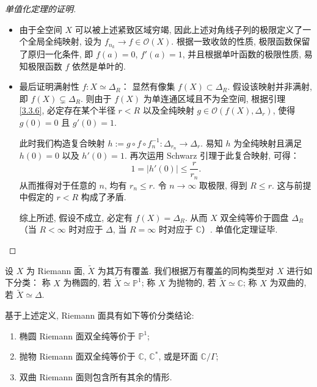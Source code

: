 \begin{proof}[单值化定理的证明]
\begin{itemize}
\item[(e)]\qquad 由于全空间 $X$ 可以被上述紧致区域穷竭, 因此上述对角线子列的极限定义了一个全局全纯映射, 设为 $f_{n_k} \to f \in \mathcal{O}(X)$. 根据一致收敛的性质, 极限函数保留了原归一化条件, 即 $f(a)=0$, $f'(a)=1$, 并且根据单叶函数的极限性质, 易知极限函数 $f$ 依然是单叶的. 

\item[(f)]\qquad 最后证明满射性 $f: X \simeq \Delta_R$：
显然有像集 $f(X) \subset \Delta_R$. 假设该映射并非满射, 即 $f(X) \subsetneq \Delta_R$. 则由于 $f(X)$ 为单连通区域且不为全空间, 根据引理 \ref{3.3.6}, 必定存在某个半径 $r < R$ 以及全纯映射 $g \in \mathcal{O}(f(X), \Delta_r)$, 使得 $g(0)=0$ 且 $g'(0)=1$. 

\qquad 此时我们构造复合映射 $h := g \circ f \circ f_n^{-1} : \Delta_{r_n} \to \Delta_r$. 易知 $h$ 为全纯映射且满足 $h(0)=0$ 以及 $h'(0)=1$. 再次运用 Schwarz 引理于此复合映射, 可得：
\[ 1 = |h'(0)| \leqslant \frac{r}{r_n}. \]
从而推得对于任意的 $n$, 均有 $r_n \leqslant r$. 令 $n \to \infty$ 取极限, 得到 $R \leqslant r$. 这与前提中假定的 $r < R$ 构成了矛盾. 

\qquad 综上所述, 假设不成立, 必定有 $f(X) = \Delta_R$. 从而 $X$ 双全纯等价于圆盘 $\Delta_R$（当 $R<\infty$ 时对应于 $\Delta$, 当 $R=\infty$ 时对应于 $\mathbb{C}$）. 单值化定理证毕. 
\end{itemize}
\end{proof}

\begin{definition}
设 $X$ 为 Riemann 面, $\widetilde{X}$ 为其万有覆盖. 我们根据万有覆盖的同构类型对 $X$ 进行如下分类：
称 $X$ 为椭圆的, 若 $\widetilde{X} \simeq \mathbb{P}^1$; 
称 $X$ 为抛物的, 若 $\widetilde{X} \simeq \mathbb{C}$; 
称 $X$ 为双曲的, 若 $\widetilde{X} \simeq \Delta$.
\end{definition}

\begin{theorem}
基于上述定义, Riemann 面具有如下等价分类结论:
\begin{enumerate}
    \item 椭圆 Riemann 面双全纯等价于 $\mathbb{P}^1$;
    \item 抛物 Riemann 面双全纯等价于 $\mathbb{C}$, $\mathbb{C}^*$, 或是环面 $\mathbb{C}/\Gamma$;
    \item 双曲 Riemann 面则包含所有其余的情形.
\end{enumerate}
\end{theorem}

